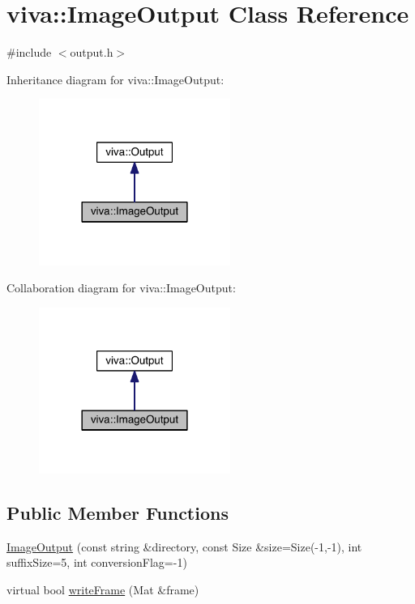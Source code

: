 \hypertarget{classviva_1_1_image_output}{}\section{viva\+:\+:Image\+Output Class Reference}
\label{classviva_1_1_image_output}


{\ttfamily \#include $<$output.\+h$>$}



Inheritance diagram for viva\+:\+:Image\+Output\+:
\nopagebreak
\begin{figure}[H]
\begin{center}
\leavevmode
\includegraphics[width=177pt]{classviva_1_1_image_output__inherit__graph}
\end{center}
\end{figure}


Collaboration diagram for viva\+:\+:Image\+Output\+:
\nopagebreak
\begin{figure}[H]
\begin{center}
\leavevmode
\includegraphics[width=177pt]{classviva_1_1_image_output__coll__graph}
\end{center}
\end{figure}
\subsection*{Public Member Functions}
\begin{DoxyCompactItemize}
\item 
\hyperlink{classviva_1_1_image_output_a157487785ed80da026c0723a3e8aeef5}{Image\+Output} (const string \&directory, const Size \&size=Size(-\/1,-\/1), int suffix\+Size=5, int conversion\+Flag=-\/1)
\item 
virtual bool \hyperlink{classviva_1_1_image_output_a327d64edf5251fe9fb841f348d5b62cb}{write\+Frame} (Mat \&frame)
\end{DoxyCompactItemize}
